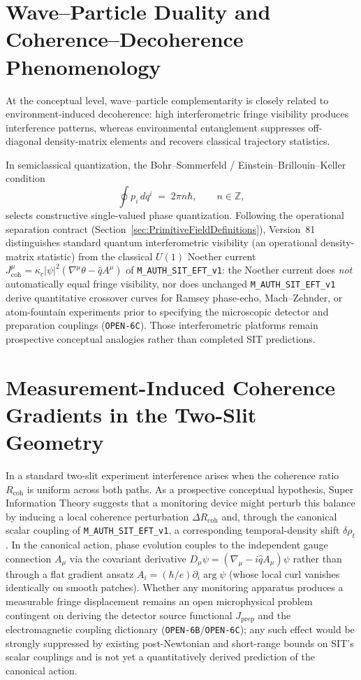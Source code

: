\section{Wave--Particle Duality and Coherence--Decoherence Phenomenology}
\label{sec:duality}

At the conceptual level, wave--particle complementarity is closely related to environment-induced decoherence: high interferometric fringe visibility produces interference patterns, whereas environmental entanglement suppresses off-diagonal density-matrix elements and recovers classical trajectory statistics.

In semiclassical quantization, the Bohr--Sommerfeld / Einstein--Brillouin--Keller condition
\begin{equation}\label{eq:EBK}
   \oint p_i\,dq^i \;=\; 2\pi n\hbar,
   \qquad n\in\mathbb{Z},
\end{equation}
selects constructive single-valued phase quantization. Following the operational separation contract (Section~\ref{sec:PrimitiveFieldDefinitions}), Version~81 distinguishes standard quantum interferometric visibility (an operational density-matrix statistic) from the classical $U(1)$ Noether current $J^\mu_{\mathrm{coh}} = \kappa_c|\psi|^2(\nabla^\mu\theta - \hat{q}A^\mu)$ of \texttt{M\_AUTH\_SIT\_EFT\_v1}: the Noether current does \emph{not} automatically equal fringe visibility, nor does unchanged \texttt{M\_AUTH\_SIT\_EFT\_v1} derive quantitative crossover curves for Ramsey phase-echo, Mach--Zehnder, or atom-fountain experiments prior to specifying the microscopic detector and preparation couplings (\texttt{OPEN-6C}). Those interferometric platforms remain prospective conceptual analogies rather than completed SIT predictions.

\section{Measurement-Induced Coherence Gradients in the Two-Slit Geometry}
\label{sec:two-slit}

In a standard two-slit experiment interference arises when the
coherence ratio \(R_{\text{coh}}\) is uniform across both paths. As a
prospective conceptual hypothesis, Super Information Theory suggests
that a monitoring device might perturb this balance by inducing a
local coherence perturbation \(\Delta R_{\text{coh}}\) and, through
the canonical scalar coupling of \texttt{M\_AUTH\_SIT\_EFT\_v1}, a
corresponding temporal-density shift \(\delta\rho_t\). In the
canonical action, phase evolution couples to the independent gauge
connection \(A_\mu\) via the covariant derivative
\(D_\mu\psi = (\nabla_\mu - i\hat{q}A_\mu)\psi\) rather than through a
flat gradient ansatz \(A_i = (\hbar/e)\partial_i\arg\psi\) (whose
local curl vanishes identically on smooth patches). Whether any
monitoring apparatus produces a measurable fringe displacement remains
an open microphysical problem contingent on deriving the detector
source functional \(J_{\mathrm{prep}}\) and the electromagnetic
coupling dictionary (\texttt{OPEN-6B}/\texttt{OPEN-6C}); any such
effect would be strongly suppressed by existing post-Newtonian and
short-range bounds on SIT's scalar couplings and is not yet a
quantitatively derived prediction of the canonical action.

